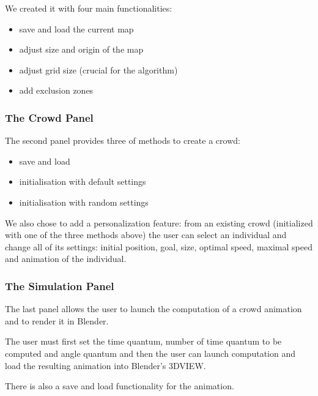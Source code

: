 We created it with four main functionalities:
\begin{itemize}
\item save and load the current map
\item adjust size and origin of the map
\item adjust grid size (crucial for the algorithm)
\item add exclusion zones
\end{itemize}


\subsubsection{The Crowd Panel} 

The second panel provides three of methods to create a crowd:
\begin{itemize}
\item save and load
\item initialisation with default settings
\item initialisation with random settings
\end{itemize}

We also chose to add a personalization feature: from an existing crowd
(initialized with one of the three methods above) the user can select
an individual and change all of its settings: initial position, goal,
size, optimal speed, maximal speed and animation of the individual.


\subsubsection{The Simulation Panel} 

The last panel allows the user to launch the computation of a crowd
animation and to render it in Blender.

The user must first set the time quantum, number of time quantum to be
computed and angle quantum and then the user can launch
computation and load the resulting animation into Blender's 3DVIEW.


There is also a save and load functionality for the animation.

